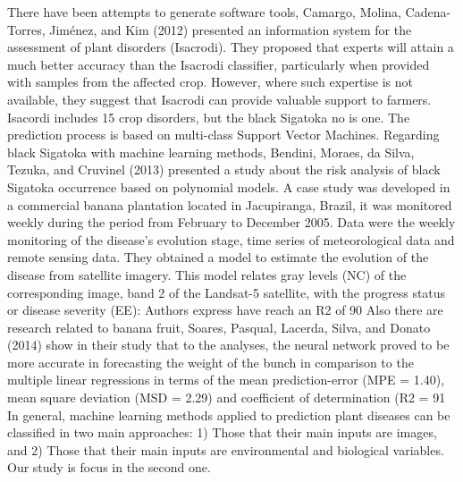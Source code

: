 \documentclass[review]{elsarticle}
\begin{document}
{{There have been attempts to generate software tools, Camargo, Molina, Cadena-Torres, Jiménez, and Kim (2012) presented an information system for the assessment of plant disorders (Isacrodi). They proposed that experts will attain a much better accuracy than the Isacrodi classifier, particularly when provided with samples from the affected crop. However, where such expertise is not available, they suggest that Isacrodi can provide valuable support to farmers. Isacordi includes 15 crop disorders, but the black Sigatoka no is one. The prediction process is based on multi-class Support Vector Machines.
Regarding black Sigatoka with machine learning methods, Bendini, Moraes, da Silva, Tezuka, and Cruvinel (2013) presented a study about the risk analysis of black Sigatoka occurrence based on polynomial models. A case study was developed in a commercial banana plantation located in Jacupiranga, Brazil, it was monitored weekly during the period from February to December 2005. Data were the weekly monitoring of the disease’s evolution stage, time series of meteorological data and remote sensing data. They obtained a model to estimate the evolution of the disease from satellite imagery. This model relates gray levels (NC) of the corresponding image, band 2 of the Landsat-5 satellite, with the progress status or disease severity (EE): Authors express have reach an R2 of 90%
Also there are research related to banana fruit, Soares, Pasqual, Lacerda, Silva, and Donato (2014) show in their study that  to the analyses, the neural network proved to be more accurate in forecasting the weight of the bunch in comparison to the multiple linear regressions in terms of the mean prediction-error (MPE = 1.40), mean square deviation (MSD = 2.29) and coefficient of determination (R2 = 91%
In general, machine learning methods applied to prediction plant diseases can be classified in two main approaches: 1) Those that their main inputs are images, and 2) Those that their main inputs are environmental and biological variables. Our study is focus in the second one.

}}
\end{document}
